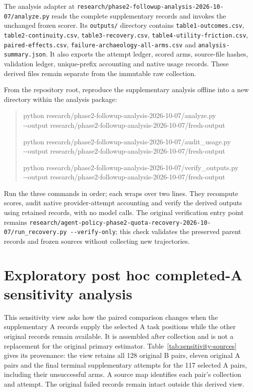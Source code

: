 \documentclass[11pt,a4paper]{article}
\newcommand{\code}[1]{\nolinkurl{#1}}
\begin{document}
The analysis adapter at \code{research/phase2-followup-analysis-2026-10-07/analyze.py} reads the complete supplementary records and invokes the unchanged frozen scorer. Its \code{outputs/} directory contains \code{table1-outcomes.csv}, \code{table2-continuity.csv}, \code{table3-recovery.csv}, \code{table4-utility-friction.csv}, \code{paired-effects.csv}, \code{failure-archaeology-all-arms.csv} and \code{analysis-summary.json}. It also exports the attempt ledger, scored arms, source-file hashes, validation ledger, unique-prefix accounting and native usage records. These derived files remain separate from the immutable raw collection.

From the repository root, reproduce the supplementary analysis offline into a new directory within the analysis package:
\begin{quote}\small\ttfamily
python research/phase2-followup-analysis-2026-10-07/analyze.py\\
\hspace*{1em}-{}-output research/phase2-followup-analysis-2026-10-07/fresh-output
\par\medskip
python research/phase2-followup-analysis-2026-10-07/audit\_usage.py\\
\hspace*{1em}-{}-output research/phase2-followup-analysis-2026-10-07/fresh-output
\par\medskip
python research/phase2-followup-analysis-2026-10-07/verify\_outputs.py\\
\hspace*{1em}-{}-output research/phase2-followup-analysis-2026-10-07/fresh-output
\end{quote}
Run the three commands in order; each wraps over two lines. They recompute scores, audit native provider-attempt accounting and verify the derived outputs using retained records, with no model calls. The original verification entry point remains \code{research/agent-policy-phase2-quota-recovery-2026-10-07/run_recovery.py --verify-only}; this check validates the preserved parent records and frozen sources without collecting new trajectories.

\section{Exploratory post hoc completed-A sensitivity analysis}
\label{app:completed-a-sensitivity}
This sensitivity view asks how the paired comparison changes when the supplementary A records supply the selected A task positions while the other original records remain available. It is assembled after collection and is not a replacement for the original primary estimator. Table~\ref{tab:sensitivity-sources} gives its provenance: the view retains all 128 original B pairs, eleven original A pairs and the final terminal supplementary attempts for the 117 selected A pairs, including their unsuccessful arms. A source map identifies each pair's collection and attempt. The original failed records remain intact outside this derived view.
\end{document}
